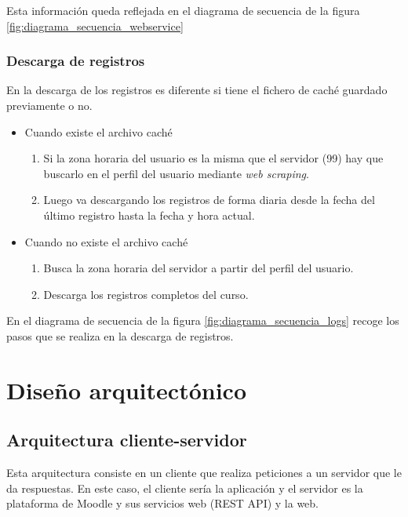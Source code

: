 Esta información queda reflejada en el diagrama de secuencia de la figura \ref{fig:diagrama_secuencia_webservice}

\subsubsection{Descarga de registros}

En la descarga de los registros es diferente si tiene el fichero de caché guardado previamente o no.

\begin{itemize}
	\item Cuando existe el archivo caché
	\begin{enumerate}
		\item Si la zona horaria del usuario es la misma que el servidor (99) hay que buscarlo en el perfil del usuario mediante \textit{web scraping}. 
		\item Luego va descargando los registros de forma diaria desde la fecha del último registro hasta la fecha y hora actual.
	\end{enumerate}
	\item Cuando no existe el archivo caché
	\begin{enumerate}
		\item Busca la zona horaria del servidor a partir del perfil del usuario.
		\item Descarga los registros completos del curso.
	\end{enumerate}
\end{itemize}

En el diagrama de secuencia de la figura \ref{fig:diagrama_secuencia_logs} recoge los pasos que se realiza en la descarga de registros.


\section{Diseño arquitectónico}

\subsection{Arquitectura cliente-servidor}
Esta arquitectura consiste en un cliente que realiza peticiones a un servidor que le da respuestas. En este caso, el cliente sería la aplicación y el servidor es la plataforma de Moodle y sus servicios web (REST API) y la web.

